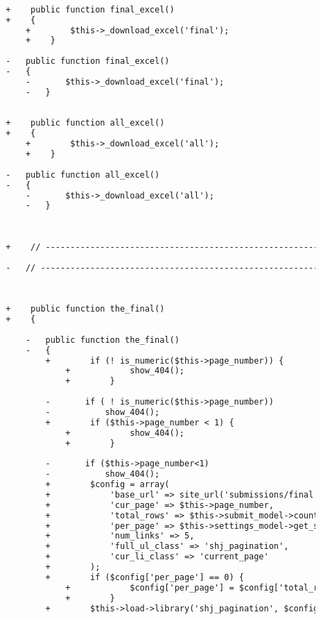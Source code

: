 \begin{lstlisting}[language=diff, caption=Perubahan pada kode Submissions.php]
		
		
		+    public function final_excel()
		+    {
			+        $this->_download_excel('final');
			+    }
		
		-	public function final_excel()
		-	{
			-		$this->_download_excel('final');
			-	}
		
		
		+    public function all_excel()
		+    {
			+        $this->_download_excel('all');
			+    }
		
		-	public function all_excel()
		-	{
			-		$this->_download_excel('all');
			-	}
		
		
		
		+    // ------------------------------------------------------------------------
		
		-	// ------------------------------------------------------------------------
		
		
		
		+    public function the_final()
		+    {
			
			-	public function the_final()
			-	{
				+        if (! is_numeric($this->page_number)) {
					+            show_404();
					+        }
				
				-		if ( ! is_numeric($this->page_number))
				-			show_404();
				+        if ($this->page_number < 1) {
					+            show_404();
					+        }
				
				-		if ($this->page_number<1)
				-			show_404();
				+        $config = array(
				+            'base_url' => site_url('submissions/final'.($this->filter_user ? '/user/'.$this->filter_user : '').($this->filter_problem ? '/problem/'.$this->filter_problem : '')),
				+            'cur_page' => $this->page_number,
				+            'total_rows' => $this->submit_model->count_final_submissions($this->user->selected_assignment['id'], $this->user->level, $this->user->username, $this->filter_user, $this->filter_problem),
				+            'per_page' => $this->settings_model->get_setting('results_per_page_final'),
				+            'num_links' => 5,
				+            'full_ul_class' => 'shj_pagination',
				+            'cur_li_class' => 'current_page'
				+        );
				+        if ($config['per_page'] == 0) {
					+            $config['per_page'] = $config['total_rows'];
					+        }
				+        $this->load->library('shj_pagination', $config);
				

\end{lstlisting}
